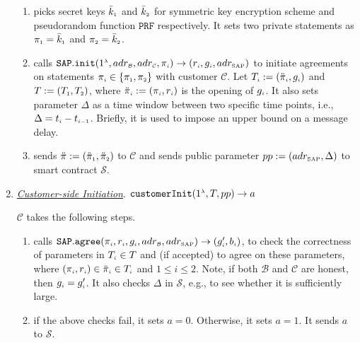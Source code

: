 \begin{enumerate}
\begin{enumerate}
\item\label{RCPoRP::setup} picks   secret keys $\bar k_{\scriptscriptstyle 1}$ and $\bar k_{\scriptscriptstyle 2}$ for  symmetric key encryption scheme and  pseudorandom function $\mathtt{PRF}$ respectively. It  sets two private statements as $\pi_{\scriptscriptstyle 1}=\bar k_{\scriptscriptstyle 1}$ and $\pi_{\scriptscriptstyle 2}= \bar k_{\scriptscriptstyle 2}$.
%
\item\label{RCPoRP::set-qp}  calls $\mathtt{SAP.init}(1^{\scriptscriptstyle\lambda}, adr_{\scriptscriptstyle\mathcal{B}}, adr_{\scriptscriptstyle\mathcal{C}}, \pi_{\scriptscriptstyle i})\rightarrow(r_{
\scriptscriptstyle i}, g_{\scriptscriptstyle i}, adr_{\scriptscriptstyle\text{SAP}})$ to initiate  agreements on  statements $\pi_{\scriptscriptstyle i}\in \{\pi_{\scriptscriptstyle 1}, \pi_{\scriptscriptstyle 2}\}$  with customer $\mathcal{C}$.  Let $T_{\scriptscriptstyle i}:=(\ddot{\pi}_{\scriptscriptstyle i}, g_{\scriptscriptstyle i})$ and $T:=(T_{\scriptscriptstyle 1}, T_{\scriptscriptstyle 2})$,  where  $\ddot{\pi}_{\scriptscriptstyle i}:=(\pi_{\scriptscriptstyle i}, r_{\scriptscriptstyle i})$ is the opening of $g_{\scriptscriptstyle i}$.  It also sets parameter $\Delta$ as a time window between two specific time points, i.e., $\Delta=t_{\scriptscriptstyle i} - t_{\scriptscriptstyle i-1}$. Briefly, it is used to impose an upper bound on a message delay.  %
%
\item sends $\ddot{\pi}:=(\ddot{\pi}_{\scriptscriptstyle 1}, \ddot{\pi}_{\scriptscriptstyle 2})$ to   $\mathcal{C}$ and   sends  public parameter $pp:=(adr_{\scriptscriptstyle\text{SAP}},\Delta)$ to  smart contract $\mathcal{S}$.
%
\end{enumerate}


\item \underline{\textit{Customer-side Initiation}}\label{customer-side-Initiation}. $\mathtt{customerInit} (1^{\scriptscriptstyle \lambda}, T, pp)\rightarrow a$

$\mathcal{C}$ takes the following steps. 

\begin{enumerate}
%
\item\label{customer-side-Initiation-SAP-agree} calls   $\mathtt{SAP.agree}(\pi_{\scriptscriptstyle i}, r_{\scriptscriptstyle i}, g_{\scriptscriptstyle i}, adr_{\scriptscriptstyle\mathcal{B}}, adr_{\scriptscriptstyle\text{SAP}})\rightarrow (g'_{\scriptscriptstyle i}, b_{\scriptscriptstyle i})$, to check the correctness of parameters in $T_{\scriptscriptstyle i}\in T$ and (if accepted) to agree on these parameters, where $(\pi_{\scriptscriptstyle i}, r_{\scriptscriptstyle i}) \in \ddot{\pi}_{\scriptscriptstyle i}\in T_{\scriptscriptstyle i}$ and $1\leq i \leq 2$. Note,  if both $\mathcal{B}$ and $\mathcal{C}$ are honest, then $g_{\scriptscriptstyle i}=g'_{\scriptscriptstyle i}$. It also checks $\Delta$ in  $\mathcal{S}$, e.g., to see whether it is sufficiently large.
%
\item if the above checks fail,  it sets $a=0$. Otherwise, it sets $a=1$. It sends $a$ to $\mathcal{S}$. 
\end{enumerate}
%


\end{enumerate}
